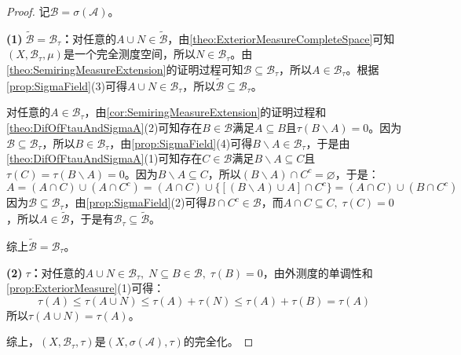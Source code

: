 \begin{proof}
	记$\mathscr{B}=\sigma(\mathscr{A})$。\par
	\textbf{(1)$\;\tilde{\mathscr{B}}=\mathscr{B}_\tau$：}对任意的$A\cup N\in\tilde{\mathscr{B}}$，由\cref{theo:ExteriorMeasureCompleteSpace}可知$(X,\mathscr{B}_\tau,\mu)$是一个完全测度空间，所以$N\in\mathscr{B}_\tau$。由\cref{theo:SemiringMeasureExtension}的证明过程可知$\mathscr{B}\subseteq\mathscr{B}_\tau$，所以$A\in\mathscr{B}_\tau$。根据\cref{prop:SigmaField}(3)可得$A\cup N\in\mathscr{B}_\tau$，所以$\tilde{\mathscr{B}}\subseteq\mathscr{B}_\tau$。\par
	对任意的$A\in\mathscr{B}_\tau$，由\cref{cor:SemiringMeasureExtension}的证明过程和\cref{theo:DifOfFtauAndSigmaA}(2)可知存在$B\in\mathscr{B}$满足$A\subseteq B$且$\tau(B\backslash A)=0$。因为$\mathscr{B}\subseteq\mathscr{B}_\tau$，所以$B\in\mathscr{B}_\tau$，由\cref{prop:SigmaField}(4)可得$B\backslash A\in\mathscr{B}_\tau$，于是由\cref{theo:DifOfFtauAndSigmaA}(1)可知存在$C\in\mathscr{B}$满足$B\backslash A\subseteq C$且$\tau(C)=\tau(B\backslash A)=0$。因为$B\backslash A\subseteq C$，所以$(B\backslash A)\cap C^c=\varnothing$，于是：
	\begin{equation*}
		A=(A\cap C)\cup(A\cap C^c)=(A\cap C)\cup\{[(B\backslash A)\cup A]\cap C^c\}=(A\cap C)\cup(B\cap C^c)
	\end{equation*}
	因为$\mathscr{B}\subseteq\mathscr{B}_\tau$，由\cref{prop:SigmaField}(2)可得$B\cap C^c\in\mathscr{B}$，而$A\cap C\subseteq C,\;\tau(C)=0$，所以$A\in\tilde{\mathscr{B}}$，于是有$\mathscr{B}_\tau\subseteq\tilde{\mathscr{B}}$。\par
	综上$\tilde{\mathscr{B}}=\mathscr{B}_\tau$。\par
	\textbf{(2)$\;\tau$：}对任意的$A\cup N\in\mathscr{B}_\tau,\;N\subseteq B\in\mathscr{B},\;\tau(B)=0$，由外测度的单调性和\cref{prop:ExteriorMeasure}(1)可得：
	\begin{equation*}
		\tau(A)\leqslant\tau(A\cup N)\leqslant\tau(A)+\tau(N)\leqslant\tau(A)+\tau(B)=\tau(A)
	\end{equation*}
	所以$\tau(A\cup N)=\tau(A)$。\par
	综上，$(X,\mathscr{B}_\tau,\tau)$是$(X,\sigma(\mathscr{A}),\tau)$的完全化。
\end{proof}
